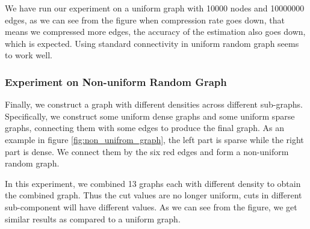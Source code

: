 \documentclass{article}
\begin{document}

We have run our experiment on a uniform graph with 10000 nodes and 10000000 edges, as we can see from the figure when compression rate goes down, that means we compressed more edges, the accuracy of the estimation also goes down, which is expected. Using standard connectivity in uniform random graph seems to work well.

\subsubsection{Experiment on Non-uniform Random Graph}
Finally, we construct a graph with different densities across different sub-graphs. Specifically, we construct some uniform dense graphs and some uniform sparse graphs, connecting them with some edges to produce the final graph. As an example in figure \ref{fig:non_unifrom_graph}, the left part is sparse while the right part is dense. We connect them by the six red edges and form a non-uniform random graph.


In this experiment, we combined 13 graphs each with different density to obtain the combined graph. Thus the cut values are no longer uniform, cuts in different sub-component will have different values. As we can see from the figure, we get similar results as compared to a uniform graph.
\end{document}
